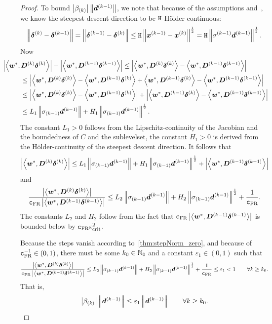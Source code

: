 \documentclass{article}
\theoremstyle{plain}
\theoremstyle{definition}
\begin{document}
\begin{proof}
	To bound $\left|\beta_{(k)}\right|\left\|\bm{d}^{(k-1)}\right\|$, we note that
	because of the assumptions and~\cite{svaiterMultiobjectiveSteepestDescent2018},
	we know the steepest descent direction to be $\mathtt{H}$-Hölder
	continuous:
	$$
	\left\|\bm{\delta}^{(k)} - \bm{\delta}^{(k-1)}\right\|
	=
	\left\|\bm{\delta}^{(k-1)} - \bm{\delta}^{(k)}\right\|
	\leq
	\mathtt{H}
	\left\|\bm{x}^{(k-1)} - \bm{x}^{(k)}\right\|^\frac{1}{2}
	=
	\mathtt{H}
	\left\|\sigma^{(k-1)}\bm{d}^{(k-1)}\right\|^\frac{1}{2}.
	$$
	Now 
	\begin{align*}
	&\hspace{-1cm}\abs{\mul{\ve w^*}{\ve D\KK\sdK}}
	-
	\abs{\mul{\ve w^*}{\ve D\KKp \sdKp}}
	\leq
	\abs{
	\mul{\ve w^*}{\ve D\KK\sdK}
	-
	\mul{\ve w^*}{\ve D\KKp\sdKp}
	}
	\\
	&\leq
	\abs{
		\mul{\ve w^*}{\ve D\KK\sdK}
		-
		\mul{\ve w^*}{\ve D\KKp\sdK}
		+
		\mul{\ve w^*}{\ve D\KKp\sdK}
		-
		\mul{\ve w^*}{\ve D\KKp\sdKp}
	}
	\\
	&\leq
	\abs{
		\mul{\ve w^*}{\ve D\KK\sdK}
		-
		\mul{\ve w^*}{\ve D\KKp\sdK}
	}
	+
	\abs{
		\mul{\ve w^*}{\ve D\KKp\sdK}
		-
		\mul{\ve w^*}{\ve D\KKp\sdKp}
	}
	\\
	&\leq
	L_1 \norm{\szKp \vdKp}
	+ 
	H_1 \norm{\szKp \vdKp}^{\frac{1}{2}}.
	\end{align*}
	The constant $L_1>0$ follows from the Lipschitz-continuity of the Jacobian and the boundedness
	of $C$ and the sublevelset, the constant $H_1>0$ is derived from the Hölder-continuity
	of the steepest descent direction.
	It follows that
	$$
	\left|\left\langle \bm{w}^*, \bm{D}^{(k)}\bm{\delta}^{(k)} \right\rangle\right|
	\leq
	L_1 \left\|\sigma_{(k-1)} \bm{d}^{(k-1)}\right\|
	+ 
	H_1 \left\|\sigma_{(k-1)} \bm{d}^{(k-1)}\right\|^{\frac{1}{2}}
	+
	\left|\left\langle \bm{w}^*, \bm{D}^{(k-1)}\bm{\delta}^{(k-1)} \right\rangle\right|
	$$
	and
	$$
	\frac{
		\left|\left\langle \bm{w}^*, \bm{D}^{(k)}\bm{\delta}^{(k)} \right\rangle\right|
	}{
		\mathtt{c}_{\text{FR}}
		\left|\left\langle \bm{w}^*, \bm{D}^{(k-1)}\bm{\delta}^{(k-1)} \right\rangle\right|
	}
	\leq
	L_2 \left\|\sigma_{(k-1)} \bm{d}^{(k-1)}\right\|
	+ 
	H_2 \left\|\sigma_{(k-1)} \bm{d}^{(k-1)}\right\|^{\frac{1}{2}}
	+
	\frac{1}{\mathtt{c}_{\text{FR}}}.
	$$
	The constants $L_2$ and $H_2$ follow from the fact that 
	$\mathtt{c}_{\text{FR}} \left|\left\langle \bm{w}^*, \bm{D}^{(k-1)}\bm{\delta}^{(k-1)} \right\rangle\right|$ is bounded below by
	$\mathtt{c}_{\text{FR}} \varepsilon_{\mathrm{crit}}^2$.
		
	Because the steps vanish according to~\cref{thm:stepNorm_zero}, 
	and because of $\mathtt{c}_{\text{FR}}^{-1} \in (0,1)$,
	there must be some $k_0\in \mathbb N_0$ 
	and a constant $\varepsilon_1 \in (0,1)$
	such that
	$$
	\frac{
		\left|\left\langle \bm{w}^*, \bm{D}^{(k)}\bm{\delta}^{(k)} \right\rangle\right|
	}{
		\mathtt{c}_{\text{FR}}
		\left|\left\langle \bm{w}^*, \bm{D}^{(k-1)}\bm{\delta}^{(k-1)} \right\rangle\right|
	}
	\leq
	L_2 \left\|\sigma_{(k-1)} \bm{d}^{(k-1)}\right\|
	+ 
	H_2 \left\|\sigma_{(k-1)} \bm{d}^{(k-1)}\right\|^{\frac{1}{2}}
	+
	\frac{1}{\mathtt{c}_{\text{FR}}}
	\leq 
		\varepsilon_1 < 1
		\qquad \forall k\geq k_0.
	$$
	That is, 
	$$
	\left|\beta_{(k)}\right|\left\|\bm{d}^{(k-1)}\right\|
	\leq \varepsilon_1 \left\|\bm{d}^{(k-1)}\right\| \qquad\forall k\geq k_0.
	$$


\end{proof}
\end{document}
